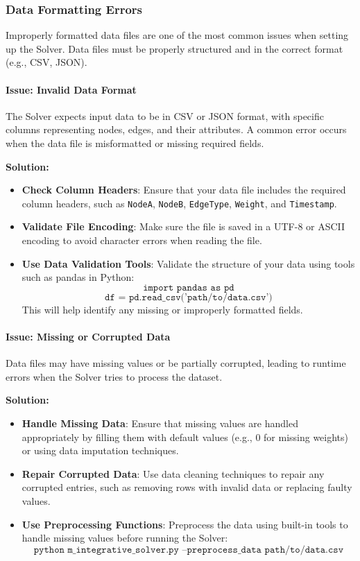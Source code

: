 \documentclass[%
 preprint, linenumbers,
 amsmath,amssymb,
 aps, physrev,
]{revtex4-2}
\begin{document}
\subsubsection{Data Formatting Errors}

Improperly formatted data files are one of the most common issues when setting up the Solver. Data files must be properly structured and in the correct format (e.g., CSV, JSON).

\paragraph{Issue: Invalid Data Format}
The Solver expects input data to be in CSV or JSON format, with specific columns representing nodes, edges, and their attributes. A common error occurs when the data file is misformatted or missing required fields.

\textbf{Solution:}
\begin{itemize}
    \item \textbf{Check Column Headers}: Ensure that your data file includes the required column headers, such as \texttt{NodeA}, \texttt{NodeB}, \texttt{EdgeType}, \texttt{Weight}, and \texttt{Timestamp}.
    \item \textbf{Validate File Encoding}: Make sure the file is saved in a UTF-8 or ASCII encoding to avoid character errors when reading the file.
    \item \textbf{Use Data Validation Tools}: Validate the structure of your data using tools such as pandas in Python:
    \[
    \texttt{import pandas as pd}
    \]
    \[
    \texttt{df = pd.read\_csv('path/to/data.csv')}
    \]
    This will help identify any missing or improperly formatted fields.
\end{itemize}

\paragraph{Issue: Missing or Corrupted Data}
Data files may have missing values or be partially corrupted, leading to runtime errors when the Solver tries to process the dataset.

\textbf{Solution:}
\begin{itemize}
    \item \textbf{Handle Missing Data}: Ensure that missing values are handled appropriately by filling them with default values (e.g., 0 for missing weights) or using data imputation techniques.
    \item \textbf{Repair Corrupted Data}: Use data cleaning techniques to repair any corrupted entries, such as removing rows with invalid data or replacing faulty values.
    \item \textbf{Use Preprocessing Functions}: Preprocess the data using built-in tools to handle missing values before running the Solver:
    \[
    \texttt{python m\_integrative\_solver.py --preprocess\_data path/to/data.csv}
    \]
\end{itemize}
\end{document}
